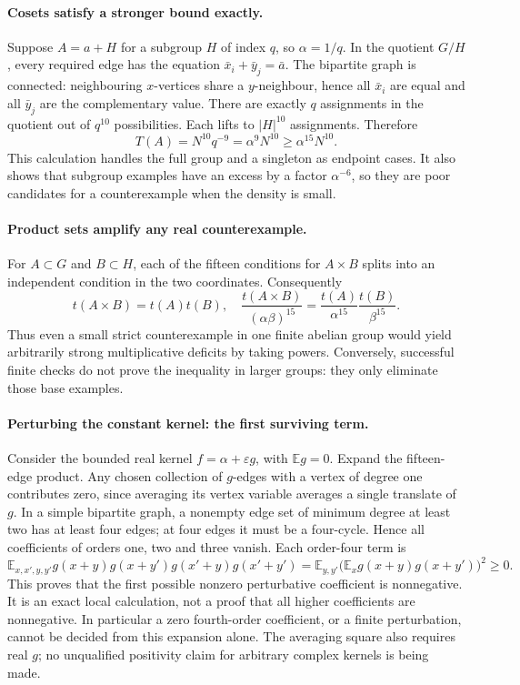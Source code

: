 \documentclass[11pt,a4paper]{article}
\newcommand{\E}{\mathbb{E}}
\begin{document}
\paragraph{Cosets satisfy a stronger bound exactly.}
Suppose $A=a+H$ for a subgroup $H$ of index $q$, so $\alpha=1/q$. In the quotient $G/H$, every required edge has the equation $\bar x_i+\bar y_j=\bar a$. The bipartite graph is connected: neighbouring $x$-vertices share a $y$-neighbour, hence all $\bar x_i$ are equal and all $\bar y_j$ are the complementary value. There are exactly $q$ assignments in the quotient out of $q^{10}$ possibilities. Each lifts to $|H|^{10}$ assignments. Therefore
\[
 T(A)=N^{10}q^{-9}=\alpha^9N^{10}\geq\alpha^{15}N^{10}.
\]
This calculation handles the full group and a singleton as endpoint cases. It also shows that subgroup examples have an excess by a factor $\alpha^{-6}$, so they are poor candidates for a counterexample when the density is small.

\paragraph{Product sets amplify any real counterexample.}
For $A\subset G$ and $B\subset H$, each of the fifteen conditions for $A\times B$ splits into an independent condition in the two coordinates. Consequently
\[
 t(A\times B)=t(A)t(B),\quad
 \frac{t(A\times B)}{(\alpha\beta)^{15}}
 =\frac{t(A)}{\alpha^{15}}\frac{t(B)}{\beta^{15}}.
\]
Thus even a small strict counterexample in one finite abelian group would yield arbitrarily strong multiplicative deficits by taking powers. Conversely, successful finite checks do not prove the inequality in larger groups: they only eliminate those base examples.

\paragraph{Perturbing the constant kernel: the first surviving term.}
Consider the bounded real kernel $f=\alpha+\varepsilon g$, with $\E g=0$. Expand the fifteen-edge product. Any chosen collection of $g$-edges with a vertex of degree one contributes zero, since averaging its vertex variable averages a single translate of $g$. In a simple bipartite graph, a nonempty edge set of minimum degree at least two has at least four edges; at four edges it must be a four-cycle. Hence all coefficients of orders one, two and three vanish. Each order-four term is
\[
 \E_{x,x',y,y'}g(x+y)g(x+y')g(x'+y)g(x'+y')
 =\E_{y,y'}\bigl(\E_x g(x+y)g(x+y')\bigr)^2\geq0.
\]
This proves that the first possible nonzero perturbative coefficient is nonnegative. It is an exact local calculation, not a proof that all higher coefficients are nonnegative. In particular a zero fourth-order coefficient, or a finite perturbation, cannot be decided from this expansion alone. The averaging square also requires real $g$; no unqualified positivity claim for arbitrary complex kernels is being made.
\end{document}
